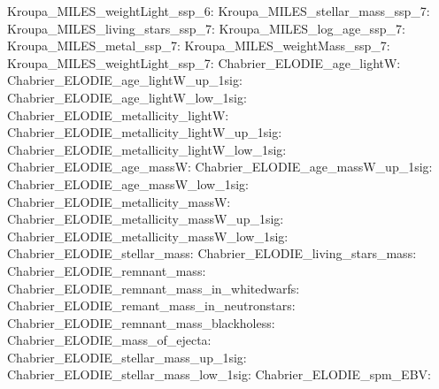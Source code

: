 Kroupa\_MILES\_weightLight\_ssp\_6:  \newline 
Kroupa\_MILES\_stellar\_mass\_ssp\_7:  \newline 
Kroupa\_MILES\_living\_stars\_ssp\_7:  \newline 
Kroupa\_MILES\_log\_age\_ssp\_7:  \newline 
Kroupa\_MILES\_metal\_ssp\_7:  \newline 
Kroupa\_MILES\_weightMass\_ssp\_7:  \newline 
Kroupa\_MILES\_weightLight\_ssp\_7:  \newline 
Chabrier\_ELODIE\_age\_lightW:  \newline 
Chabrier\_ELODIE\_age\_lightW\_up\_1sig:  \newline 
Chabrier\_ELODIE\_age\_lightW\_low\_1sig:  \newline 
Chabrier\_ELODIE\_metallicity\_lightW:  \newline 
Chabrier\_ELODIE\_metallicity\_lightW\_up\_1sig:  \newline 
Chabrier\_ELODIE\_metallicity\_lightW\_low\_1sig:  \newline 
Chabrier\_ELODIE\_age\_massW:  \newline 
Chabrier\_ELODIE\_age\_massW\_up\_1sig:  \newline 
Chabrier\_ELODIE\_age\_massW\_low\_1sig:  \newline 
Chabrier\_ELODIE\_metallicity\_massW:  \newline 
Chabrier\_ELODIE\_metallicity\_massW\_up\_1sig:  \newline 
Chabrier\_ELODIE\_metallicity\_massW\_low\_1sig:  \newline 
Chabrier\_ELODIE\_stellar\_mass:  \newline 
Chabrier\_ELODIE\_living\_stars\_mass:  \newline 
Chabrier\_ELODIE\_remnant\_mass:  \newline 
Chabrier\_ELODIE\_remnant\_mass\_in\_whitedwarfs:  \newline 
Chabrier\_ELODIE\_remant\_mass\_in\_neutronstars:  \newline 
Chabrier\_ELODIE\_remnant\_mass\_blackholess:  \newline 
Chabrier\_ELODIE\_mass\_of\_ejecta:  \newline 
Chabrier\_ELODIE\_stellar\_mass\_up\_1sig:  \newline 
Chabrier\_ELODIE\_stellar\_mass\_low\_1sig:  \newline 
Chabrier\_ELODIE\_spm\_EBV:  \newline 
